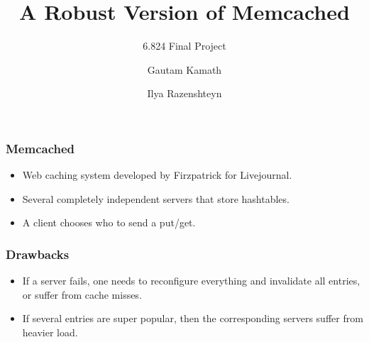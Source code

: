 \documentclass{beamer}
\title{A Robust Version of Memcached}
\subtitle{6.824 Final Project}
\author{Gautam Kamath \and Ilya Razenshteyn}
\institute{MIT}
\begin{document}
    \begin{frame}
      \titlepage
    \end{frame}
    \begin{frame}
        \frametitle{Memcached}
        \begin{itemize}
            \item Web caching system developed by Firzpatrick for Livejournal.
            \item Several completely independent servers that store hashtables.
            \item A client chooses who to send a put/get.
        \end{itemize}
    \end{frame}
    \begin{frame}
        \frametitle{Drawbacks}
        \begin{itemize}
            \item If a server fails, one needs to reconfigure everything and invalidate
            all entries, or suffer from cache misses.
            \item If several entries are super popular, then the corresponding servers
            suffer from heavier load.
        \end{itemize}
    \end{frame}
\end{document}
